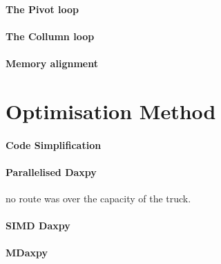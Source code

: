 \documentclass[conference]{acmsiggraph}
\begin{document}
\paragraph{The Pivot loop}



\paragraph{The Collumn loop}

\paragraph{Memory alignment}


\section{Optimisation Method}

\paragraph{Code Simplification}

\paragraph{Parallelised Daxpy}
 no route was over the capacity of the truck.

\paragraph{SIMD Daxpy}


\paragraph{MDaxpy}


\afterpage{\clearpage}
\end{document}
